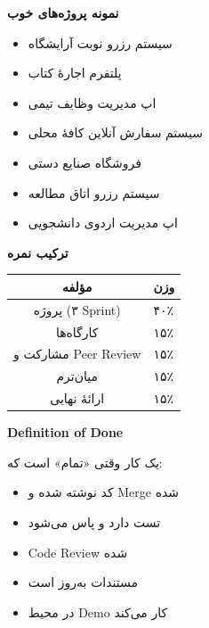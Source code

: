 \documentclass[14pt, a4paper, landscape]{extarticle}
\newcommand{\slide}[1]{%
    \newpage
    \begin{center}
    \begin{minipage}[t]{0.95\textwidth}
    \vspace{0.5cm}
    #1
    \vspace{0.5cm}
    \end{minipage}
    \end{center}
}
\newcommand{\slidetitle}[1]{%
    \begin{center}
        {\LARGE\bfseries\textcolor{primary}{#1}}
    \end{center}
    \vspace{0.5cm}
}
\begin{document}
\slide{
    \slidetitle{نمونه پروژه‌های خوب}
    \vspace{0.5cm}
    \begin{itemize}[itemsep=0.5em]
        \item سیستم رزرو نوبت آرایشگاه
        \item پلتفرم اجارهٔ کتاب
        \item اپ مدیریت وظایف تیمی
        \item سیستم سفارش آنلاین کافهٔ محلی
        \item فروشگاه صنایع دستی
        \item سیستم رزرو اتاق مطالعه
        \item اپ مدیریت اردوی دانشجویی
    \end{itemize}
}

\slide{
    \slidetitle{ترکیب نمره}
    \vspace{0.5cm}
    \begin{center}
        \begin{tabular}{cl}
            \toprule
            \textbf{مؤلفه} & \textbf{وزن} \\
            \midrule
            پروژه (۳ Sprint) & ۴۰٪ \\
            \hline
            کارگاه‌ها & ۱۵٪ \\
            \hline
            مشارکت و Peer Review & ۱۵٪ \\
            \hline
            میان‌ترم & ۱۵٪ \\
            \hline
            ارائهٔ نهایی & ۱۵٪ \\
            \bottomrule
        \end{tabular}
    \end{center}
}

\slide{
    \slidetitle{Definition of Done}
    \vspace{0.5cm}
    {\large یک کار وقتی «تمام» است که:}
    \vspace{0.5cm}
    \begin{itemize}[itemsep=0.5em]
        \item کد نوشته شده و Merge شده
        \item تست دارد و پاس می‌شود
        \item Code Review شده
        \item مستندات به‌روز است
        \item در محیط Demo کار می‌کند
    \end{itemize}
}
\end{document}
